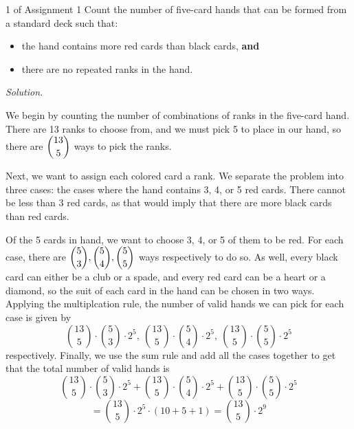 \documentclass{eh-homework}
\begin{document}
    \newpage

    \begin{question}{1 of Assignment 1}
        Count the number of five-card hands that can be formed from a standard deck such that:
        \begin{itemize}
            \item the hand contains more red cards than black cards, \textbf{and}
            \item there are no repeated ranks in the hand.
        \end{itemize}
        
        \textit{Solution.}

        We begin by counting the number of combinations of ranks in the five-card hand. There are 13 ranks to choose from, and we must pick 5 to place in our hand, so there are \(\dbinom{13}{5}\) ways to pick the ranks.
        
        \smallbreak
        
        Next, we want to assign each colored card a rank. We separate the problem into three cases: the cases where the hand contains 3, 4, or 5 red cards. There cannot be less than 3 red cards, as that would imply that there are more black cards than red cards.
        
        \smallbreak

        Of the 5 cards in hand, we want to choose 3, 4, or 5 of them to be red. For each case, there are \(\dbinom{5}{3},\dbinom{5}{4},\dbinom{5}{5}\) ways respectively to do so. As well, every black card can either be a club or a spade, and every red card can be a heart or a diamond, so the suit of each card in the hand can be chosen in two ways. Applying the multiplcation rule, the number of valid hands we can pick for each case is given by
        \[
            {13 \choose 5} \cdot {5 \choose 3} \cdot 2^5 ,\ {13 \choose 5} \cdot {5 \choose 4} \cdot 2^5,\ {13 \choose 5} \cdot {5 \choose 5} \cdot 2^5
        \]
        respectively. Finally, we use the sum rule and add all the cases together to get that the total number of valid hands is
        \[
            {13 \choose 5} \cdot {5 \choose 3} \cdot 2^5 + {13 \choose 5} \cdot {5 \choose 4} \cdot 2^5 + {13 \choose 5} \cdot {5 \choose 5} \cdot 2^5
        \]
        \[
            = {13 \choose 5} \cdot 2^5 \cdot (10 + 5 + 1) = {13 \choose 5} \cdot 2^9
        \]
    \end{question}
    \newpage
\end{document}
